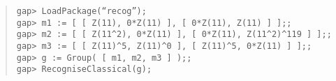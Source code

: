 \documentclass[a4paper,11pt]{article}
\theoremstyle{bla}
\begin{document}
\begin{quote}

\hspace*{-1cm} \texttt{gap> LoadPackage(``recog'');}\\
\hspace*{-1cm} \texttt{gap> m1 := [ [ Z(11), 0*Z(11) ], [ 0*Z(11), Z(11) ] ];;}\\
\hspace*{-1cm} \texttt{gap> m2 := [ [ Z(11\^{}2), 0*Z(11) ], [ 0*Z(11), Z(11\^{}2)\^{}119 ] ];;}\\
\hspace*{-1cm} \texttt{gap> m3 := [ [ Z(11)\^{}5, Z(11)\^{}0 ], [ Z(11)\^{}5, 0*Z(11) ] ];;}\\
\hspace*{-1cm} \texttt{gap> g := Group( [ m1, m2, m3 ] );;}\\
\hspace*{-1cm} \texttt{gap> RecogniseClassical(g);}\\


\end{quote}
\end{document}
